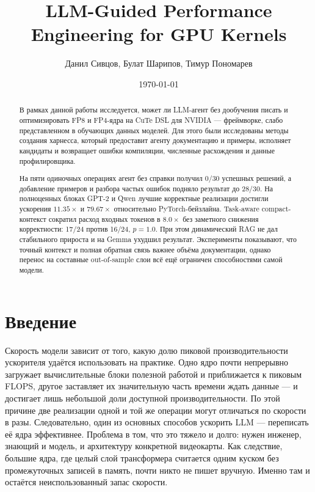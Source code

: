 \documentclass[10pt,a4paper]{article}
\title{\vspace{-2em}LLM-Guided Performance Engineering for GPU Kernels}
\author{Данил Сивцов, Булат Шарипов, Тимур Пономарев}
\date{\today}
\begin{document}
\maketitle
\vspace{-2em}

\begin{abstract}
В рамках данной работы исследуется, может ли LLM-агент без дообучения писать и оптимизировать FP8 и FP4-ядра на CuTe DSL для NVIDIA --- фреймворке, 
слабо представленном
в обучающих данных моделей. Для этого были исследованы методы создания харнесса, который
предоставит агенту документацию и примеры, исполняет кандидаты и возвращает
ошибки компиляции, численные расхождения и данные профилировщика.

На пяти одиночных операциях агент без справки получил 0/30 успешных
решений, а добавление примеров и разбора частых ошибок подняло результат до
28/30. На полноценных блоках GPT-2 и Qwen лучшие корректные реализации достигли
ускорения $11.35\times$ и $79.67\times$ относительно PyTorch-бейзлайна.
Task-aware compact-контекст сократил расход входных токенов в $8.0\times$
без заметного снижения корректности: 17/24 против 16/24, $p=1.0$.
При этом динамический RAG не дал стабильного прироста и на Gemma ухудшил
результат. Эксперименты показывают, что точный контекст и полная обратная
связь важнее объёма документации, однако перенос на составные out-of-sample
слои всё ещё ограничен способностями самой модели.
\end{abstract}

\section{Введение}

Скорость модели зависит от того, какую долю пиковой производительности ускорителя удаётся использовать на практике. Одно ядро почти непрерывно загружает вычислительные блоки полезной работой и приближается к пиковым FLOPS, другое заставляет их значительную часть времени ждать данные — и достигает лишь небольшой доли доступной производительности. По этой причине две реализации одной и той же операции могут отличаться по скорости в разы. Следовательно, один из основных способов ускорить LLM --- переписать её ядра
эффективнее. Проблема в том, что это тяжело и долго: нужен инженер, знающий и модель, и
архитектуру конкретной видеокарты. Как следствие, большие ядра, где целый слой
трансформера считается одним куском без промежуточных записей в память, почти никто не
пишет вручную. Именно там и остаётся неиспользованный запас скорости.
\end{document}
